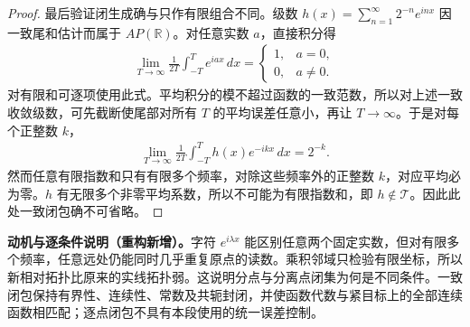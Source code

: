\documentclass[../../main.tex]{subfiles}
\begin{document}
\begin{proof}
最后验证闭生成确与只作有限组合不同。级数 $h(x)=\sum_{n=1}^{\infty}2^{-n}e^{inx}$ 因一致尾和估计而属于 $AP(\mathbb R)$。对任意实数 $a$，直接积分得
\begin{align*}
\lim_{T\to\infty}\frac1{2T}\int_{-T}^T e^{iax}\,dx
=\begin{cases}1,&a=0,\\0,&a\ne0.\end{cases}
\end{align*}
对有限和可逐项使用此式。平均积分的模不超过函数的一致范数，所以对上述一致收敛级数，可先截断使尾部对所有 $T$ 的平均误差任意小，再让 $T\to\infty$。于是对每个正整数 $k$，
\begin{align*}
\lim_{T\to\infty}\frac1{2T}\int_{-T}^T h(x)e^{-ikx}\,dx=2^{-k}.
\end{align*}
然而任意有限指数和只有有限多个频率，对除这些频率外的正整数 $k$，对应平均必为零。$h$ 有无限多个非零平均系数，所以不可能为有限指数和，即 $h\notin\mathcal T$。因此此处一致闭包确不可省略。
\end{proof}
\begin{remark}
\textbf{动机与逐条件说明（重构新增）。}字符 $e^{i\lambda x}$ 能区别任意两个固定实数，但对有限多个频率，任意远处仍能同时几乎重复原点的读数。乘积邻域只检验有限坐标，所以新相对拓扑比原来的实线拓扑弱。这说明分点与分离点闭集为何是不同条件。一致闭包保持有界性、连续性、常数及共轭封闭，并使函数代数与紧目标上的全部连续函数相匹配；逐点闭包不具有本段使用的统一误差控制。
\end{remark}
\end{document}
